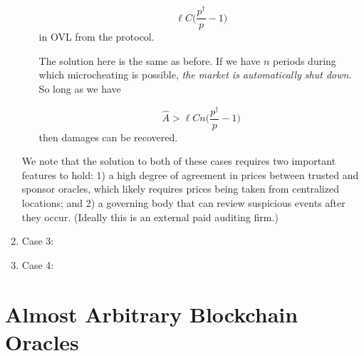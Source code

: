 \documentclass[11pt]{article}
\begin{document}
\begin{enumerate}
\begin{enumerate}
			 \begin{equation}
				 \ell C \Big(\frac{p^\dagger}{p} -1 \Big) 
			 \end{equation}
			in OVL from the protocol. 


			The solution here is the same as before. If we have  $n$  periods during which microcheating is possible, {\it the market is automatically shut down}. So long as we have 

			 \begin{equation}
				 \hat{A} > \ell C n \Big(\frac{p^\dagger}{p} -1 \Big) 
			 \end{equation}
			 then damages can be recovered. 
		 \end{enumerate}

		 We note that the solution to both of these cases requires two important features to hold: 1) a high degree of agreement in  prices between trusted and sponsor oracles, which likely requires prices being taken from centralized locations; and 2) a governing body that can review  suspicious events after they occur. (Ideally this is an external paid auditing firm.) 
\subitem 



	 \item Case 3:
	 \item Case 4:
 \end{enumerate}








 \section{Almost Arbitrary Blockchain Oracles}


 
\end{document}
